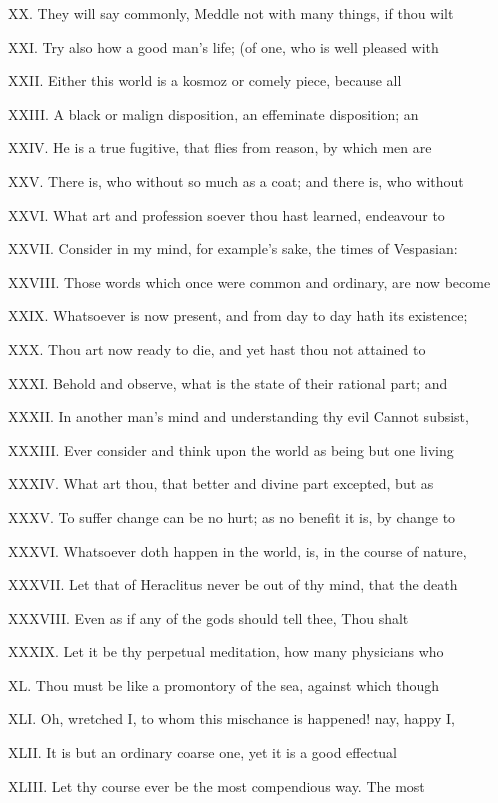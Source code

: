 XX. They will say commonly, Meddle not with
many things, if thou wilt

XXI. Try also how a good man's life; (of one,
who is well pleased with

XXII. Either this world is a kosmoz or comely
piece, because all

XXIII. A black or malign disposition, an
effeminate disposition; an

XXIV. He is a true fugitive, that flies from
reason, by which men are

XXV. There is, who without so much as a coat;
and there is, who without

XXVI. What art and profession soever thou hast
learned, endeavour to

XXVII. Consider in my mind, for example's
sake, the times of Vespasian:

XXVIII. Those words which once were common and
ordinary, are now become

XXIX. Whatsoever is now present, and from day
to day hath its existence;

XXX. Thou art now ready to die, and yet hast
thou not attained to

XXXI. Behold and observe, what is the state of
their rational part; and

XXXII. In another man's mind and understanding
thy evil Cannot subsist,

XXXIII. Ever consider and think upon the world
as being but one living

XXXIV. What art thou, that better and divine
part excepted, but as

XXXV. To suffer change can be no hurt; as no
benefit it is, by change to

XXXVI. Whatsoever doth happen in the world,
is, in the course of nature,

XXXVII. Let that of Heraclitus never be out of
thy mind, that the death

XXXVIII. Even as if any of the gods should
tell thee, Thou shalt

XXXIX. Let it be thy perpetual meditation, how
many physicians who

XL. Thou must be like a promontory of the sea,
against which though

XLI. Oh, wretched I, to whom this mischance is
happened! nay, happy I,

XLII. It is but an ordinary coarse one, yet it
is a good effectual

XLIII. Let thy course ever be the most
compendious way. The most

